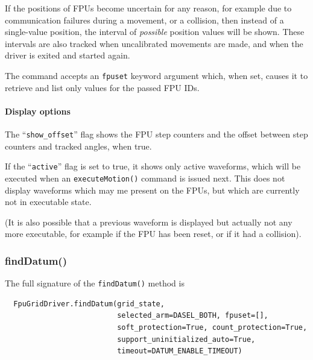 \documentclass[11pt,a4paper]{report}
\begin{document}
If the positions of FPUs become uncertain for any reason, for example
due to communication failures during a movement, or a collision, then
instead of a single-value position, the interval of \emph{possible}
position values will be shown.  These intervals are also tracked when
uncalibrated movements are made, and when the driver is exited and
started again.


The command accepts an \texttt{fpuset} keyword argument which, when
set, causes it to retrieve and list only values for the passed FPU
IDs.

\paragraph{Display options}

The ``\texttt{show\_offset}'' flag shows the FPU step counters and
the offset between step counters and tracked angles, when
true.

If the ``\texttt{active}'' flag is set to true, it shows only active
waveforms, which will be executed when an \texttt{executeMotion()}
command is issued next. This does not display waveforms which may me
present on the FPUs, but which are currently not in executable state.

(It is also possible that a previous waveform is displayed but
actually not any more executable, for example if the FPU has been
reset, or if it had a collision).

\subsubsection{findDatum()}
\label{sec:finddatum}

The full signature of the \texttt{findDatum()} method is

\begin{verbatim}
  FpuGridDriver.findDatum(grid_state,
                          selected_arm=DASEL_BOTH, fpuset=[],
                          soft_protection=True, count_protection=True, 
                          support_uninitialized_auto=True,
                          timeout=DATUM_ENABLE_TIMEOUT)
\end{verbatim}
\end{document}

